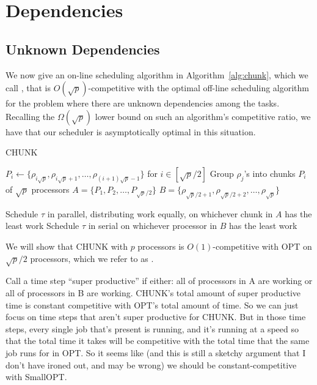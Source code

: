 \section{Dependencies}
\label{sec:dependencies}

\subsection{Unknown Dependencies}
We now give an on-line scheduling algorithm in
Algorithm~\ref{alg:chunk}, which we call , that is
$O(\sqrt{p})$-competitive with the optimal off-line scheduling
algorithm for the problem where there are unknown dependencies
among the tasks.
Recalling the $\Omega(\sqrt{p})$ lower bound on such an
algorithm's competitive ratio, we have that our scheduler is
asymptotically optimal in this situation.

\begin{algorithm}
  \caption{CHUNK}
  \label{alg:chunk}
  \begin{algorithmic}
    \State $P_i \gets \{\rho_{i\sqrt{p}}, \rho_{i\sqrt{p}+1}, \ldots, \rho_{(i+1)\sqrt{p}-1}\}$ for $i \in [\sqrt{p}/2]$
    \State
    \Comment Group $\rho_j$'s into chunks $P_i$ of $\sqrt{p}$ processors
    \State $A = \{P_1,P_2, \ldots, P_{\sqrt{p}/2} \} $
    \State $B = \{\rho_{\sqrt{p}/2 + 1},\rho_{\sqrt{p}/2 + 2}, \ldots, \rho_{\sqrt{p}} \} $

        \State Schedule $\tau$ in parallel, distributing work equally, on whichever chunk in $A$ has the least work
      \Else
        \State Schedule $\tau$ in serial on whichever processor in $B$ has the least work
      \EndIf
    \EndIf
  \end{algorithmic}
\end{algorithm}

We will show that CHUNK with $p$ processors is $O(1)$-competitive
with OPT on $\sqrt{p}/2$ processors, which we refer to as
.

{\color{red}
Call a time step \enquote{super productive} if either: all of processors in A are working or all of processors in B are working.
CHUNK's total amount of super productive time is constant competitive with OPT's total amount of time.
So we can just focus on time steps that aren't super productive for CHUNK. 
But in those time steps, every single job that's present is
running, and it's running at a speed so that the total time it
takes will be competitive with the total time that the same job
runs for in OPT.
So it seems like (and this is still a sketchy argument that I
don't have ironed out, and may be wrong) we should be
constant-competitive with SmallOPT.
}

